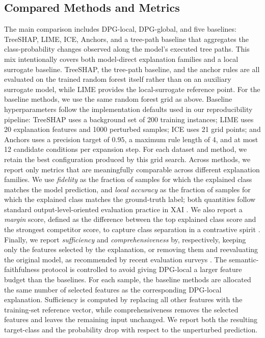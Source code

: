 \documentclass[runningheads]{llncs}
\begin{document}
\subsection{Compared Methods and Metrics}
The main comparison includes DPG-local, DPG-global, and five baselines: TreeSHAP, LIME, ICE, Anchors, and a tree-path baseline that aggregates the class-probability changes observed along the model's executed tree paths.
This mix intentionally covers both model-direct explanation families and a local surrogate baseline. TreeSHAP, the tree-path baseline, and the anchor rules are all evaluated on the trained random forest itself rather than on an auxiliary surrogate model, while LIME provides the local-surrogate reference point.
For the baseline methods, we use the same random forest grid as above. Baseline hyperparameters follow the implementation defaults used in our reproducibility pipeline: TreeSHAP uses a background set of 200 training instances; LIME uses 20 explanation features and 1000 perturbed samples; ICE uses 21 grid points; and Anchors uses a precision target of $0.95$, a maximum rule length of 4, and at most 12 candidate conditions per expansion step. For each dataset and method, we retain the best configuration produced by this grid search.
Across methods, we report only metrics that are meaningfully comparable across different explanation families. We use \emph{fidelity} as the fraction of samples for which the explained class matches the model prediction, and \emph{local accuracy} as the fraction of samples for which the explained class matches the ground-truth label; both quantities follow standard
output-level-oriented evaluation practice in XAI
\cite{vilone2021notions,nauta2023anecdotal,doshi2017rigorous}. We also report a \emph{margin} score, defined as the difference between the top explained class score and the strongest competitor score, to capture class separation in a contrastive spirit \cite{miller2019explanation}. Finally, we report \emph{sufficiency} and \emph{comprehensiveness} by, respectively, keeping only the features selected by the explanation, or removing them and reevaluating the original model, as recommended by recent evaluation surveys \cite{nauta2023anecdotal}.
The semantic-faithfulness protocol is controlled to avoid giving DPG-local a larger feature budget than the baselines. For each sample, the baseline methods are allocated the same number of selected features as the corresponding DPG-local explanation. Sufficiency is computed by replacing all other features with the training-set reference vector, while comprehensiveness removes the selected features and leaves the remaining input unchanged. We report both the resulting target-class and the probability drop with respect to the unperturbed prediction.
\end{document}
